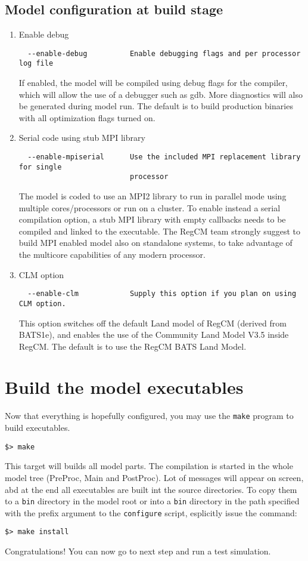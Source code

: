 \subsection{Model configuration at build stage}
\label{modconf}

\begin{enumerate}
\item Enable debug
\begin{Verbatim}
  --enable-debug          Enable debugging flags and per processor log file
\end{Verbatim}
If enabled, the model will be compiled using debug flags for the compiler,
which will allow the use of a debugger such as gdb. More diagnostics will
also be generated during model run.
The default is to build production binaries with all optimization flags
turned on.

\item Serial code using stub MPI library
\begin{Verbatim}
  --enable-mpiserial      Use the included MPI replacement library for single
                          processor
\end{Verbatim}
The model is coded to use an MPI2 library to run in parallel mode using
multiple cores/processors or run on a cluster. To enable instead a serial
compilation option, a stub MPI library with empty callbacks needs to be
compiled and linked to the executable.
The RegCM team strongly suggest to build MPI enabled model also on standalone
systems, to take advantage of the multicore capabilities of any modern
processor.
\item CLM option
\begin{Verbatim}
  --enable-clm            Supply this option if you plan on using CLM option.
\end{Verbatim}
This option switches off the default Land model of RegCM (derived from BATS1e),
and enables the use of the Community Land Model V3.5 inside RegCM. The default
is to use the RegCM BATS Land Model.
\end{enumerate}

\section{Build the model executables}

Now that everything is hopefully configured, you may use the \verb=make=
program to build executables.

\begin{Verbatim}
$> make
\end{Verbatim}

This target will builds all model parts. 
The compilation is started in the whole model tree (PreProc, Main and PostProc).
Lot of messages will appear on screen, abd at the end all executables are built
int the source directories.
To copy them to a \verb=bin= directory in the model root or into a \verb=bin=
directory in the path specified with the prefix argument to the \verb=configure=
script, esplicitly issue the command:

\begin{Verbatim}
$> make install
\end{Verbatim}

Congratulations! You can now go to next step and run a test simulation.

